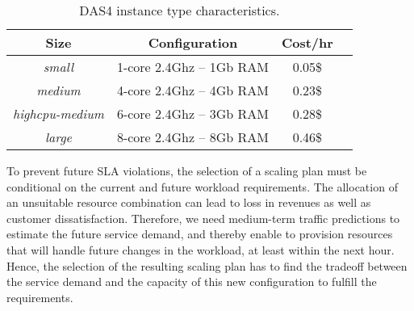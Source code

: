 \begin{table}
  {\scriptsize 
\begin{center}
    \begin{tabular}{  | c | c | c | c | }
    \hline
       \textbf{Size}  & \textbf{Configuration} & \textbf{Cost/hr} \\ \hline
   \textit{small}   & 1-core 2.4Ghz -- 1Gb RAM&  0.05\$ \\ \hline
   \textit{medium}   & 4-core 2.4Ghz  -- 4Gb RAM&  0.23\$ \\ \hline
\textit{highcpu-medium} & 6-core 2.4Ghz -- 3Gb RAM& 0.28\$   \\ \hline
\textit{large} & 8-core 2.4Ghz  -- 8Gb RAM& 0.46\$   \\ \hline

 \end{tabular}
\end{center}
\vspace{-5mm}
\caption{DAS4 instance type characteristics.}
\label{DAS4instances}
}
\end{table}

To prevent future SLA violations, the selection of a scaling plan must be conditional on the current and future workload requirements. The allocation of an unsuitable resource combination can lead to loss in revenues as well as customer dissatisfaction. Therefore, we need medium-term traffic predictions to estimate the future service demand, and thereby enable to provision resources that will handle future changes in the workload, at least within the next hour. Hence, the selection of the resulting scaling plan has to find the tradeoff between the service demand and the capacity of this new configuration to fulfill the requirements. 



